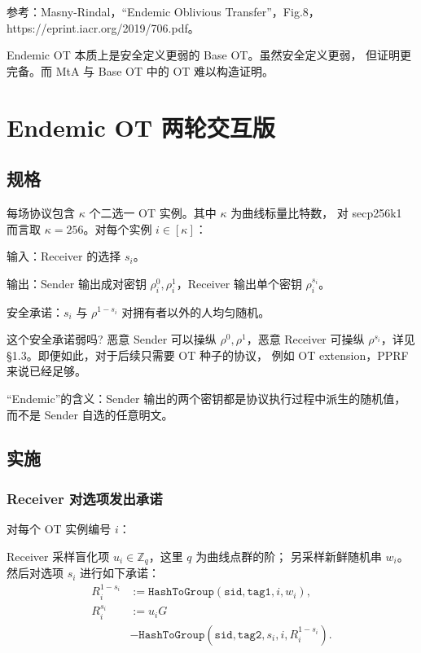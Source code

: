 

参考：Masny-Rindal，“Endemic Oblivious Transfer”，Fig.8，
https://eprint.iacr.org/2019/706.pdf。

Endemic OT 本质上是安全定义更弱的 Base OT。虽然安全定义更弱，
但证明更完备。而 MtA 与 Base OT 中的 OT 难以构造证明。

\section{Endemic OT 两轮交互版}
\subsection{规格}

每场协议包含 $\kappa$ 个二选一 OT 实例。其中 $\kappa$ 为曲线标量比特数，
对 secp256k1 而言取 $\kappa = 256$。对每个实例 $i\in[\kappa]$：

输入：Receiver 的选择 $s_i$。

输出：Sender 输出成对密钥 $\rho_i^0, \rho_i^1$，Receiver
输出单个密钥 $\rho_i^{s_i}$。

安全承诺：$s_i$ 与 $\rho^{1-s_i}$ 对拥有者以外的人均匀随机。

这个安全承诺弱吗? 恶意 Sender 可以操纵 $\rho^0, \rho^1$，恶意 Receiver
可操纵 $\rho^{s_i}$，详见 §1.3。即便如此，对于后续只需要 OT 种子的协议，
例如 OT extension，PPRF 来说已经足够。

“Endemic”的含义：Sender 输出的两个密钥都是协议执行过程中派生的随机值，
而不是 Sender 自选的任意明文。

\subsection{实施}
\subsubsection{Receiver 对选项发出承诺}

对每个 OT 实例编号 $i$：

Receiver 采样盲化项 $u_i\in \mathbb{Z}_q$，这里 $q$ 为曲线点群的阶；
另采样新鲜随机串 $w_i$。然后对选项 $s_i$ 进行如下承诺：
\begin{equation}
\tag{R}\label{eq:03-endemic-ot:R}
\begin{aligned}
R_i^{1-s_i} &:=
\mathtt{HashToGroup}(\mathtt{sid}, \mathtt{tag1}, i, w_i), \\
R_i^{s_i} &:=
u_i G \\
&- \mathtt{HashToGroup}(
\mathtt{sid}, \mathtt{tag2}, s_i, i,
R_i^{1-s_i}
). 
\end{aligned}
\end{equation}


